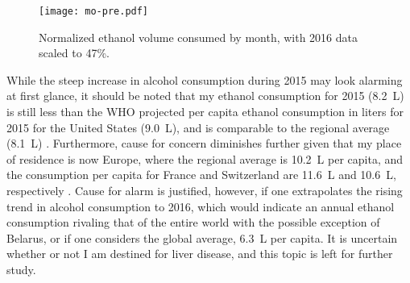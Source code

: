 \documentclass{article}
\begin{document}
\begin{multicols}{2}
	\begin{figure*}[htbp]
		\centering
		\texttt{[image: mo-pre.pdf]}
		\caption{Normalized ethanol volume consumed by month, with 2016 data scaled to 47\%.}
		\label{mo-pre}
	\end{figure*}

	While the steep increase in alcohol consumption during 2015 may look alarming at first glance, it should be noted that my ethanol consumption for 2015 (8.2~L) is still less than the WHO projected per capita ethanol consumption in liters for 2015 for the United States (9.0~L), and is comparable to the regional average (8.1~L) \cite{who}. Furthermore, cause for concern diminishes further given that my place of residence is now Europe, where the regional average is 10.2~L per capita, and the consumption per capita for France and Switzerland are 11.6~L and 10.6~L, respectively \cite{who}. Cause for alarm is justified, however, if one extrapolates the rising trend in alcohol consumption to 2016, which would indicate an annual ethanol consumption rivaling that of the entire world with the possible exception of Belarus, or if one considers the global average, 6.3~L per capita. It is uncertain whether or not I am destined for liver disease, and this topic is left for further study.


\end{multicols}
\end{document}
